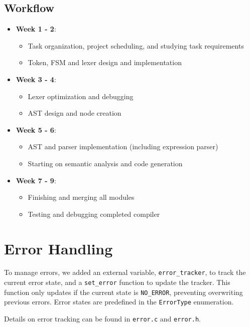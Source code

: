 \documentclass[12pt,a4paper]{article}
\begin{document}
\subsection{Workflow}
\begin{itemize}
    \item \textbf{Week 1 - 2}: 
    \begin{itemize}
        \item Task organization, project scheduling, and studying task requirements
        \item Token, FSM and lexer design and implementation
    \end{itemize}
    \item \textbf{Week 3 - 4}:
    \begin{itemize}
        \item Lexer optimization and debugging
        \item AST design and node creation
    \end{itemize}
    \item \textbf{Week 5 - 6}:
    \begin{itemize}
        \item AST and parser implementation (including expression parser)
        \item Starting on semantic analysis and code generation
    \end{itemize}
    \item \textbf{Week 7 - 9}:
    \begin{itemize}
        \item Finishing and merging all modules
        \item Testing and debugging completed compiler
    \end{itemize}
\end{itemize}

\newpage

\section{Error Handling}
To manage errors, we added an external variable, \texttt{error\_tracker}, to track the current error state, and a \texttt{set\_error} function to update the tracker. This function only updates if the current state is \texttt{NO\_ERROR}, preventing overwriting previous errors. Error states are predefined in the \texttt{ErrorType} enumeration.

Details on error tracking can be found in \texttt{error.c} and \texttt{error.h}.
\end{document}
